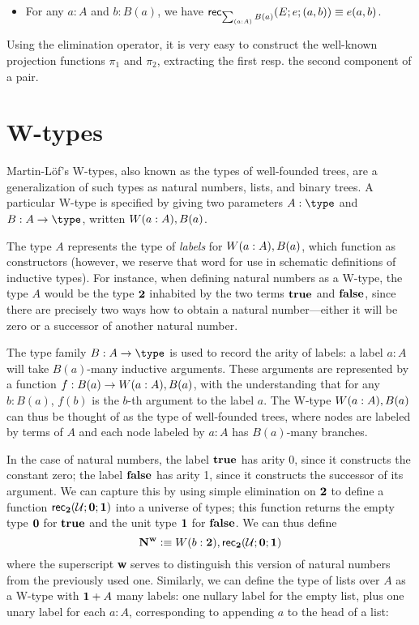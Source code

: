 \begin{itemize}
\item For any $a : A$ and $b : B(a)$, we have $\rec{\sm{a:A} B(a)}(E;e;(a,b)) \equiv e(a,b)$.
\end{itemize}
Using the elimination operator, it is very easy to construct the well-known projection functions $\pi_1$ and $\pi_2$, extracting the first resp. the second component of a pair.


\section{W-types}
\label{sec:w-types}

Martin-L{\"o}f's W-types, also known as the types of well-founded trees, are a generalization of such types as natural numbers, lists, and binary trees. A particular W-type is specified by giving two parameters $A : \type$ and $B : A \to \type$, written $W(a:A), B(a)$.

The type $A$ represents the type of \emph{labels} for $W(a :A), B(a)$, which function as constructors (however, we reserve that word for use in schematic definitions of inductive types). For instance, when defining natural numbers as a W-type, the type $A$ would be the type ${\mathbf{2}}$ inhabited by the two terms $\mathbf{true}$ and $\mathbf{false}$, since there are precisely two ways how to obtain a natural number---either it will be zero or a successor of another natural number. 

The type family $B : A \to \type$ is used to record the arity of labels: a label $a : A$ will take $B(a)$-many inductive arguments. These arguments are represented by a function $f : B(a) \to W(a :A), B(a)$, with the understanding that for any $b : B(a)$, $f(b)$ is the $b$-th argument to the label $a$. The W-type $W(a :A), B(a)$ can thus be thought of as the type of well-founded trees, where nodes are labeled by terms of $A$ and each node labeled by $a : A$ has $B(a)$-many branches.

In the case of natural numbers, the label $\mathbf{true} $ has arity 0, since it constructs the constant zero; the label $\mathbf{false}$ has arity 1, since it constructs the successor of its argument. We can capture this by using simple elimination on ${\mathbf{2}}$ to define a function $\mathsf{rec}_{{\mathbf{2}}}(\mathcal{U};\mathbf{0};\mathbf{1})$ into a universe of types; this function returns the empty type $\mathbf{0}$ for $\mathbf{true}$ and the unit type $\mathbf{1}$ for $\mathbf{false}$. We can thus define
\[ \mathbf{N^w} \vcentcolon\equiv W(b:{\mathbf{2}}), \mathsf{rec}_{{\mathbf{2}}}(\mathcal{U};\mathbf{0};\mathbf{1}) \]
where the superscript \textbf{w} serves to distinguish this version of natural numbers from the previously used one.
Similarly, we can define the type of lists over $A$ as a W-type with $\mathbf{1} + A$ many labels: one nullary label for the empty list, plus one unary label for each $a : A$, corresponding to appending $a$ to the head of a list:

